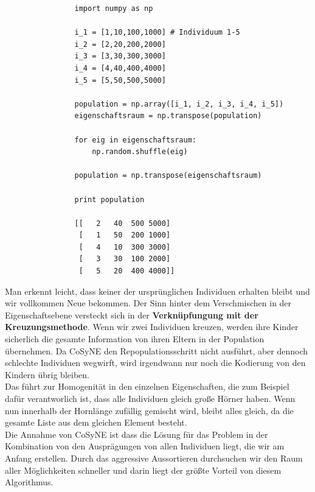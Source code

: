             \begin{mdframed}
            \begin{verbatim}
                import numpy as np

                i_1 = [1,10,100,1000] # Individuum 1-5
                i_2 = [2,20,200,2000]
                i_3 = [3,30,300,3000]
                i_4 = [4,40,400,4000]
                i_5 = [5,50,500,5000]

                population = np.array([i_1, i_2, i_3, i_4, i_5])
                eigenschaftsraum = np.transpose(population)
                
                for eig in eigenschaftsraum:
                    np.random.shuffle(eig)

                population = np.transpose(eigenschaftsraum)

                print population

                [[   2   40  500 5000]
                 [   1   50  200 1000]
                 [   4   10  300 3000]
                 [   3   30  100 2000]
                 [   5   20  400 4000]]

            \end{verbatim}
            \end{mdframed}
            \noindent
            Man erkennt leicht, dass keiner der ursprünglichen Individuen erhalten bleibt und wir vollkommen Neue bekommen. Der Sinn hinter dem Verschmischen in der Eigenschaftsebene versteckt sich in der \textbf{Verknüpfungung mit der Kreuzungsmethode}. Wenn wir zwei Individuen kreuzen, werden ihre Kinder sicherlich die gesamte Information von ihren Eltern in der Population übernehmen. Da CoSyNE den Repopulationsschritt nicht ausführt, aber dennoch schlechte Individuen wegwirft, wird irgendwann nur noch die Kodierung von den Kindern übrig bleiben.\\

            \noindent
            Das führt zur Homogenität in den einzelnen Eigenschaften, die zum Beispiel dafür verantworlich ist, dass alle Individuen gleich große Hörner haben. Wenn nun innerhalb der Hornlänge zufällig gemischt wird, bleibt alles gleich, da die gesamte Liste aus dem gleichen Element besteht. \\

            \noindent
            Die Annahme von CoSyNE ist dass die Lösung für das Problem in der Kombination von den Ausprägungen von allen Individuen liegt, die wir am Anfang erstellen. Durch das aggressive Aussortieren durchsuchen wir den Raum aller Möglichkeiten schneller und darin liegt der größte Vorteil von diesem Algorithmus.


